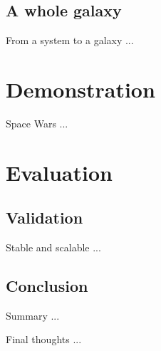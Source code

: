 \documentclass{beamer}
\begin{document}
\subsection{A whole galaxy}
\begin{frame}{From a system to a galaxy}
...
\end{frame}
\section{Demonstration}
\begin{frame}{Space Wars}
...
\end{frame}
\section{Evaluation}
\subsection{Validation}
\begin{frame}{Stable and scalable}
...
\end{frame}
\subsection{Conclusion}
\begin{frame}{Summary}
...
\end{frame}
\begin{frame}{Final thoughts}
...
\end{frame}
\end{document}
